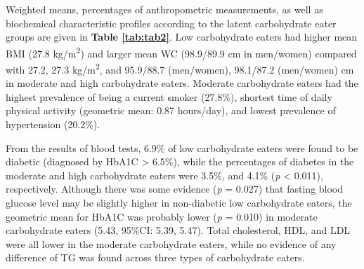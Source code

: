 Weighted means, percentages of anthropometric measurements, as well as biochemical characteristic profiles according to the latent carbohydrate eater groups are given in \textbf{Table \ref{tab:tab2}}. Low carbohydrate eaters had higher mean BMI (27.8 kg/m\textsuperscript{2}) and larger mean WC (98.9/89.9 cm in men/women) compared with 27.2, 27.3 kg/m\textsuperscript{2}, and 95.9/88.7 (men/women), 98.1/87.2 (men/women) cm in moderate and high carbohydrate eaters. Moderate carbohydrate eaters had the highest prevalence of being a current smoker (27.8\%), shortest time of daily physical activity (geometric mean: 0.87 hours/day), and lowest prevalence of hypertension (20.2\%).

From the results of blood tests, 6.9\% of low carbohydrate eaters were found to be diabetic (diagnosed by HbA1C > 6.5\%), while the percentages of diabetes in the moderate and high carbohydrate eaters were 3.5\%, and 4.1\% (\textit{p} < 0.011), respectively. Although there was some evidence (\textit{p} = 0.027) that fasting blood glucose level may be slightly higher in non-diabetic low carbohydrate eaters, the geometric mean for HbA1C was probably lower (\textit{p} = 0.010) in moderate carbohydrate eaters (5.43, 95\%CI: 5.39, 5.47). Total cholesterol, HDL, and LDL were all lower in the moderate carbohydrate eaters, while no evidence of any difference of TG was found across three types of carbohydrate eaters. 




